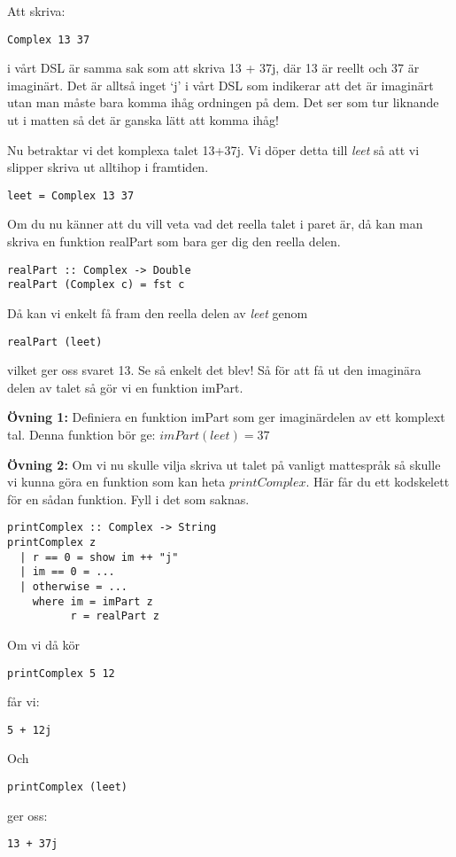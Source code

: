 \documentclass{article}
\begin{document}
Att skriva:
\begin{verbatim}
Complex 13 37
\end{verbatim} 
i vårt DSL är samma sak som att skriva 13 + 37j, där 13 är reellt och 37 är imaginärt. Det är alltså inget ‘j’ i vårt DSL som indikerar att det är imaginärt utan man måste bara komma ihåg ordningen på dem. Det ser som tur liknande ut i matten så det är ganska lätt att komma ihåg!  

Nu betraktar vi det komplexa talet 13+37j. Vi döper detta till \emph{leet} så att vi slipper skriva ut alltihop i framtiden. \\
\begin{verbatim}
leet = Complex 13 37
\end{verbatim}
Om du nu känner att du vill veta vad det reella talet i paret är, då kan man skriva en funktion realPart som bara ger dig den reella delen. \\
\begin{verbatim}
realPart :: Complex -> Double 
realPart (Complex c) = fst c 
\end{verbatim}
Då kan vi enkelt få fram den reella delen av \emph{leet} genom\\
\begin{verbatim}
realPart (leet) 
\end{verbatim}
vilket ger oss svaret 13.
Se så enkelt det blev! 
Så för att få ut den imaginära delen av talet så gör vi en funktion imPart. 

\textbf{Övning 1:} Definiera en funktion imPart som ger imaginärdelen av ett komplext tal.
Denna funktion bör ge: $imPart (leet) = 37$

\textbf{Övning 2:} Om vi nu skulle vilja skriva ut talet på vanligt mattespråk så skulle vi kunna göra en funktion som kan heta $printComplex$. Här får du ett kodskelett för en sådan funktion. Fyll i det som saknas.
\begin{verbatim}
printComplex :: Complex -> String
printComplex z
  | r == 0 = show im ++ "j"
  | im == 0 = ...
  | otherwise = ...
    where im = imPart z
          r = realPart z
\end{verbatim}
Om vi då kör 
\begin{verbatim}
printComplex 5 12
\end{verbatim}
får vi:
\begin{verbatim}
5 + 12j
\end{verbatim}
Och
\begin{verbatim}
printComplex (leet) 
\end{verbatim}
ger oss:
\begin{verbatim}
13 + 37j
\end{verbatim}
\end{document}
